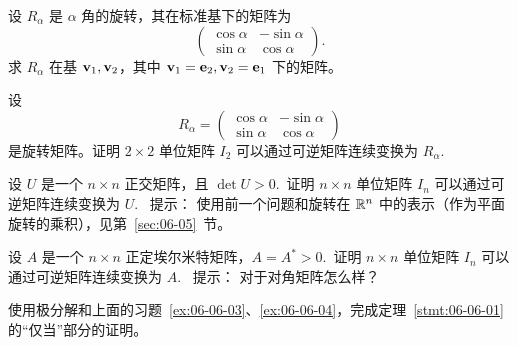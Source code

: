 \begin{problemset}
\item \label{ex:06-06-01} 设 $R_\alpha$ 是 $\alpha$ 角的旋转，其在标准基下的矩阵为
$$\begin{pmatrix} \cos \alpha & -\sin \alpha \\ \sin \alpha & \cos \alpha \end{pmatrix}.$$
求 $R_\alpha$ 在基 $\mathbf{v}_1, \mathbf{v}_2$，其中 $\mathbf{v}_1 = \mathbf{e}_2, \mathbf{v}_2 = \mathbf{e}_1$ 下的矩阵。
\item \label{ex:06-06-02} 设 $$R_\alpha = \begin{pmatrix} \cos \alpha & -\sin \alpha \\ \sin \alpha & \cos \alpha \end{pmatrix}$$ 是旋转矩阵。证明 $2 \times 2$ 单位矩阵 $I_2$ 可以通过可逆矩阵连续变换为 $R_\alpha$.~
\item \label{ex:06-06-03} 设 $U$ 是一个 $n \times n$ 正交矩阵，且 $\det U > 0$.~证明 $n \times n$ 单位矩阵 $I_n$ 可以通过可逆矩阵连续变换为 $U$.~
{\heiti 提示：} 使用前一个问题和旋转在 $\mathbb{R}^n$ 中的表示（作为平面旋转的乘积），见第~\ref{sec:06-05}~节。
\item \label{ex:06-06-04} 设 $A$ 是一个 $n \times n$ 正定埃尔米特矩阵，$A = A^* > 0$.~证明 $n \times n$ 单位矩阵 $I_n$ 可以通过可逆矩阵连续变换为 $A$.~
{\heiti 提示：} 对于对角矩阵怎么样？
\item \label{ex:06-06-05} 使用极分解和上面的习题~\ref{ex:06-06-03}、\ref{ex:06-06-04}，完成定理~\ref{stmt:06-06-01} 的“仅当”部分的证明。

\end{problemset}



